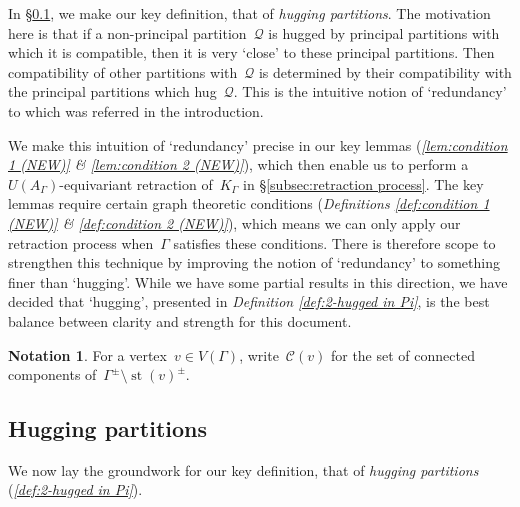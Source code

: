 \documentclass[11pt]{amsart}
\theoremstyle{definition}
\theoremstyle{definition}
\theoremstyle{definition}
\theoremstyle{definition}
\newtheorem{notation}[theorem]{Notation}
\newcommand{\calC}{\mathcal{C}}
\newcommand{\calQ}{\mathcal{Q}}
\newcommand{\uag}{U(A_{\Gamma})} %
\newcommand{\str}[1]{\operatorname{st}({#1})} %
\newcommand{\spine}{K_{\Gamma}} %
\begin{document}
In \S\ref{subsec:hugging partitions}, we make our key definition, that of \emph{hugging partitions}. The motivation here is that if a non-principal partition~$\calQ$ is hugged by principal partitions with which it is compatible, then it is very `close' to these principal partitions. Then compatibility of other partitions with~$\calQ$ is determined by their compatibility with the principal partitions which hug~$\calQ$. This is the intuitive notion of `redundancy' to which was referred in the introduction. 

We make this intuition of `redundancy' precise in our key lemmas (\emph{\ref{lem:condition 1 (NEW)} \& \ref{lem:condition 2 (NEW)}}), which then enable us to perform a~$\uag$-equivariant retraction of~$\spine$ in \S\ref{subsec:retraction process}. The key lemmas require certain graph theoretic conditions (\emph{Definitions \ref{def:condition 1 (NEW)} \& \ref{def:condition 2 (NEW)}}), which means we can only apply our retraction process when~$\Gamma$ satisfies these conditions. There is therefore scope to strengthen this technique by improving the notion of `redundancy' to something finer than `hugging'. While we have some partial results in this direction, we have decided that `hugging', presented in \emph{Definition \ref{def:2-hugged in Pi}}, is the best balance between clarity and strength for this document.

\begin{notation}
    For a vertex~$v \in V(\Gamma)$, write~$\calC(v)$ for the set of connected components of~$\Gamma^\pm \setminus \str{v}^\pm$.
\end{notation}

\subsection{Hugging partitions}\label{subsec:hugging partitions}

We now lay the groundwork for our key definition, that of \emph{hugging partitions} (\emph{\ref{def:2-hugged in Pi}}). 
\end{document}

